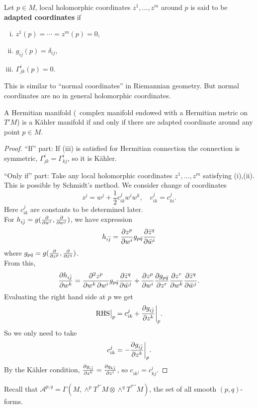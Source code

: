 \documentclass[12pt]{article}
\begin{document}
\begin{definition}
  Let \(p\in M\), local holomorphic coordinates \(z^1,\ldots,z^m\) around \(p\) is
  said to be \textbf{adapted coordinates} if
  \begin{enumerate}[(i)]
  \item \(z^1(p)=\cdots =z^m(p)=0\),
  \item \(g_{i\bar{j}}(p)=\delta_{ij}\),
  \item \(\Gamma_{jk}^i(p)=0\).
  \end{enumerate}
\end{definition}
\begin{remark}
  This is similar to ``normal coordinates'' in Riemannian geometry. But normal
  coordinates are no in general holomorphic coordinates.
\end{remark}
\begin{prop}
  A Hermitian manifold (\ie\ complex manifold endowed with a Hermitian metric on
  \(T'M\)) is a K\"ahler manifold if and only if there are adapted coordinate
  around any point \(p\in M\).
\end{prop}
\begin{proof}
  ``If'' part: If  (iii) is satisfied for Hermitian connection the connection is
  symmetric, \(\Gamma_{jk}^i=\Gamma_{kj}^i\), so it is K\"ahler.

  ``Only if'' part: Take any local holomorphic coordinates \(z^1,\ldots,z^m\)
  satisfying (i),(ii). This is possible by Schmidt's method. We consider change
  of coordinates \[
    z^j=w^j+\frac{1}{2}c_{ik}^j w^i w^k,\quad c_{ik}^j=c_{ki}^j
  .\] Here \(c_{ik}^j\) are constants to be determined later. \\
  For \(h_{i\bar{j}}=g(\pdv{}{w^i},\pdv{}{w^j})\), we have expression \[
    h_{i\bar{j}}=\pdv{z^p}{w^i}g_{p\bar{q}}\pdv{\bar{z}^q}{\bar{w}^i}
  \] where \(g_{p\bar{q}}=g(\pdv{}{z^p},\pdv{}{\bar{z}^q})\). \\
  From this, \[
    \pdv{h_{i\bar{j}}}{w^k}=\pdv{z^p}{w^k,w^i}g_{p\bar{q}}\pdv{\bar{z}^q}{\bar{w}^j}
    +\pdv{z^p}{w^i}\pdv{g_{p\bar{q}}}{z^r}\pdv{z^r}{w^k}\pdv{\bar{z}^q}{\bar{w}^j}
  .\] Evaluating the right hand side at \(p\) we get \[
    \text{RHS}\big|_{p}=c_{ik}^j+\pdv{g_{i\bar{j}}}{z^k}\bigg|_{p}
  .\] So we only need to take \[
    c_{ik}^j=-\pdv{g_{i\bar{j}}}{z^k}\bigg|_p
  .\] By the K\"ahler condition, \(\pdv{g_{i\bar{j}}}{z^k}=\pdv{g_{k\bar{j}}}{z^i}\),
  so \(c_{ik^j}=c_{kj}^i\).
\end{proof}

Recall that \(\mathcal{A}^{p,q}=\Gamma(M,\wedge^p T^{*\prime}M\otimes \wedge^q
T^{*\prime\prime}M)\), the set of all smooth \((p,q)\)-forms.
\end{document}
